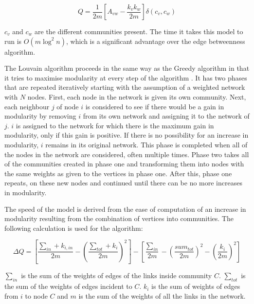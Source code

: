 \documentclass[11pt]{article}
\begin{document}
    \begin{equation}
    Q=\frac{1}{2m}\left[A_{vw}-\frac{k_{v}k_{w}}{2m}\right]\delta\left(c_{v},c_{w}\right)
    \end{equation}

$c_{v}$ and $c_{w}$ are the different communities present.  The time it takes this model to run is $O\left(m\log^2n\right)$, which is a significant advantage over the edge betweenness algorithm.

\par The Louvain algorithm proceeds in the same way as the Greedy algorithm in that it tries to maximise modularity at every step of the algorithm \citep{Blondel2008}⁠.  It has two phases that are repeated iteratively starting with the assumption of a weighted network with $N$ nodes.  First, each node in the network is given its own community.  Next, each neighbour $j$ of node $i$ is considered to see if there would be a gain in modularity by removing $i$ from its own network and assigning it to the network of $j$.  $i$ is assigned to the network for which there is the maximum gain in modularity, only if this gain is positive.  If there is no possibility for an increase in modularity, $i$ remains in its original network.  This phase is completed when all of the nodes in the network are considered, often multiple times.  Phase two takes all of the communities created in phase one and transforming them into nodes with the same weights as given to the vertices in phase one.  After this, phase one repeats, on these new nodes and continued until there can be no more increases in modularity.  

\par The speed of the model is derived from the ease of computation of an increase in modularity resulting from the combination of vertices into communities.  The following calculation is used for the algorithm:

    \begin{equation}
    \Delta Q=\left[\frac{\sum_{in}+k_{i,in}}{2m}- \left(\frac{\sum_{tot}+k_{i}}{2m}\right)^2	\right]-\left[\frac{\sum_{in}}{2m}-\left(\frac{sum_{tot}}{2m}\right)^2-\left(\frac{k_{i}}{2m}\right)^2\right]
    \end{equation}
    
$\sum_{in}$ is the sum of the weights of edges of the links inside community $C$.  $\sum_{tot}$ is the sum of the weights of edges incident to $C$.  $k_{i}$ is the sum of weights of edges from $i$ to node $C$ and $m$ is the sum of the weights of all the links in the network.  
\\
\end{document}

